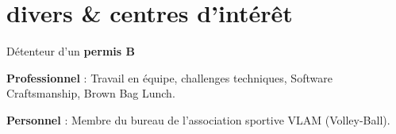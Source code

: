 \documentclass{friggeri-cv} 	%
\begin{document}

\section{divers \& centres d’intérêt}

Détenteur d’un \textbf{permis B}

\textbf{Professionnel} : Travail en équipe, challenges techniques, Software Craftsmanship, Brown Bag Lunch.

\textbf{Personnel} : Membre du bureau de l’association sportive VLAM (Volley-Ball).
\end{document}
